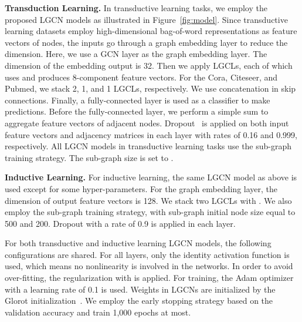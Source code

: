 \documentclass[sigconf]{acmart}
\begin{document}
\textbf{Transduction Learning.} In transductive learning tasks, we
employ the proposed LGCN models as illustrated in
Figure~\ref{fig:model}. Since transductive learning datasets employ
high-dimensional bag-of-word representations as feature vectors of
nodes, the inputs go through a graph embedding layer to reduce the
dimension. Here, we use a GCN layer as the graph embedding layer.
The dimension of the embedding output is 32. Then we apply LGCLs,
each of which uses  and produces 8-component feature vectors.
For the Cora, Citeseer, and Pubmed, we stack 2, 1, and 1 LGCLs,
respectively. We use concatenation in skip connections. Finally, a
fully-connected layer is used as a classifier to make predictions.
Before the fully-connected layer, we perform a simple sum to
aggregate feature vectors of adjacent nodes.
Dropout~\cite{srivastava2014dropout} is applied on both input
feature vectors and adjacency matrices in each layer with rates of
0.16 and 0.999, respectively. All LGCN models in transductive
learning tasks use the sub-graph training strategy. The sub-graph
size is set to .


\textbf{Inductive Learning.} For inductive learning, the same LGCN
model as above is used except for some hyper-parameters. For the
graph embedding layer, the dimension of output feature vectors is
128. We stack two LGCLs with . We also employ the sub-graph
training strategy, with sub-graph initial node size equal to 500 and
200. Dropout with a rate of 0.9 is applied in each layer.


For both transductive and inductive learning LGCN models, the
following configurations are shared. For all layers, only the
identity activation function is used, which means no nonlinearity is
involved in the networks. In order to avoid over-fitting, the 
regularization with  is applied. For training, the
Adam optimizer~\cite{kingma2014adam} with a learning rate of 0.1 is
used. Weights in LGCNs are initialized by the Glorot
initialization~\cite{glorot2010understanding}. We employ the early
stopping strategy based on the validation accuracy and train 1,000
epochs at most.
\end{document}
